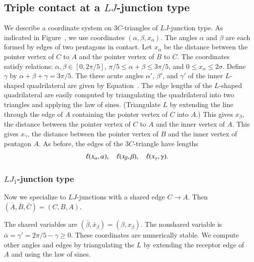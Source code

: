 \subsection{Triple contact at a $LJ$-junction type}

We describe a coordinate system on $3C$-triangles of $LJ$-junction
type.  As indicated in Figure~, we use coordinates
$(\alpha,\beta,x_\alpha)$.  The angles $\alpha$ and $\beta$ are each
formed by edges of two pentagons in contact.  Let $x_\alpha$ be the
distance between the pointer vertex of $C$ to $A$ and the pointer
vertex of $B$ to $C$.  The coordinates satisfy relations:
$\alpha,\beta\in [0,2\pi/5]$, $\pi/5\le\alpha+\beta\le 3\pi/5$, and
$0\le x_\alpha\le 2\sigma$.  Define $\gamma$ by
$\alpha+\beta+\gamma=3\pi/5$.  The three acute angles $\alpha'$,
$\beta'$, and $\gamma'$ of the inner $L$-shaped quadrilateral are
given by Equation~.  The edge lengths of the $L$-shaped
quadrilateral are easily computed by triangulating the quadrilateral
into two triangles and applying the law of sines.  (Triangulate $L$ by
extending the line through the edge of $A$ containing the pointer
vertex of $C$ into $A$.)  This gives $x_\beta$, the distance between
the pointer vertex of $C$ to $A$ and the inner vertex of $A$.  This
gives $x_\gamma$, the distance between the pointer vertex of $B$ and
the inner vertex of pentagon $A$.  As before, the edges of the
$3C$-triangle have lengths
\[
\ell(x_\alpha,\alpha),\quad \ell(x_\beta,\beta),\quad \ell(x_\gamma,\gamma).
\]


\subsubsection{$LJ_1$-junction type}

Now we specialize to $LJ$-junctions with a shared edge $C\to A$.
Then $(\bar A,\bar B,\bar C)=(C,B,A)$.

The shared variables are $(\bar \beta,\bar x_\beta)=(\beta,x_\beta)$.
The nonshared variable is $\bar\alpha=\gamma' = 2\pi/5-\gamma\ge0$.
These coordinates are numerically stable.  We compute other angles and
edges by triangulating the $L$ by extending the receptor edge of $A$
and using the law of sines.

